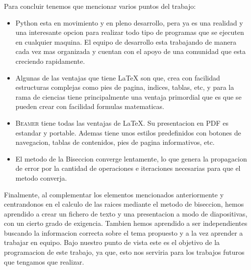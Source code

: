 
Para concluir tenemos que mencionar varios puntos del trabajo:

\begin{itemize}

\item \textsf{Python} esta en movimiento y en pleno desarrollo, pera ya es una realidad y una interesante opcion para realizar todo tipo de programas que se ejecuten en cualquier maquina. El equipo de desarrollo esta trabajando de manera cada vez mas organizada y cuentan con el apoyo de una comunidad que esta creciendo rapidamente.

\item Algunas de las ventajas que tiene \LaTeX{} son que, crea con facilidad estructuras complejas como pies de pagina, indices, tablas, etc, y para la rama de ciencias tiene principalmente una ventaja primordial que es que se pueden crear con facilidad formulas matematicas.

\item \textsc{Beamer} tiene todas las ventajas de \LaTeX{}. Su presentacion en PDF es estandar y portable. Ademas tiene unos estilos predefinidos con botones de navegacion, tablas de contenidos, pies de pagina informativos, etc.


\item El metodo de la Biseccion converge lentamente, lo que genera la propagacion de error por la cantidad de operaciones e iteraciones necesarias para que el metodo converja.

\end{itemize}

Finalmente, al complementar los elementos mencionados anteriormente y centrandonos en el calculo de las raices mediante el metodo de biseccion, hemos aprendido a crear un fichero de texto y una presentacion a modo de diapositivas, con un cierto grado de exigencia. Tambien hemos aprendido a ser independientes buscando la informacion correcta sobre el tema propuesto y a la vez aprender a trabajar en equipo.
Bajo nuestro punto de vista este es el objetivo de la programacion de este trabajo, ya que, esto nos serviria para los trabajos futuros que tengamos que realizar.